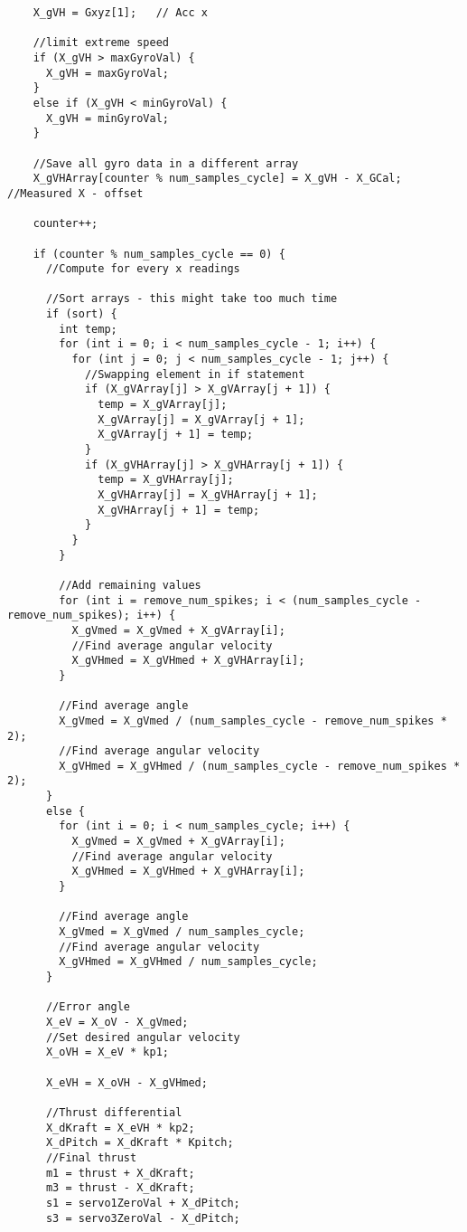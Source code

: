 \begin{lstlisting}
    X_gVH = Gxyz[1];   // Acc x
 
    //limit extreme speed
    if (X_gVH > maxGyroVal) {
      X_gVH = maxGyroVal;
    }
    else if (X_gVH < minGyroVal) {
      X_gVH = minGyroVal;
    }
 
    //Save all gyro data in a different array
    X_gVHArray[counter % num_samples_cycle] = X_gVH - X_GCal; //Measured X - offset
 
    counter++;
 
    if (counter % num_samples_cycle == 0) {
      //Compute for every x readings
 
      //Sort arrays - this might take too much time
      if (sort) {
        int temp;
        for (int i = 0; i < num_samples_cycle - 1; i++) {
          for (int j = 0; j < num_samples_cycle - 1; j++) {
            //Swapping element in if statement
            if (X_gVArray[j] > X_gVArray[j + 1]) {
              temp = X_gVArray[j];
              X_gVArray[j] = X_gVArray[j + 1];
              X_gVArray[j + 1] = temp;
            }
            if (X_gVHArray[j] > X_gVHArray[j + 1]) {
              temp = X_gVHArray[j];
              X_gVHArray[j] = X_gVHArray[j + 1];
              X_gVHArray[j + 1] = temp;
            }
          }
        }
 
        //Add remaining values
        for (int i = remove_num_spikes; i < (num_samples_cycle - remove_num_spikes); i++) {
          X_gVmed = X_gVmed + X_gVArray[i];
          //Find average angular velocity
          X_gVHmed = X_gVHmed + X_gVHArray[i];
        }
 
        //Find average angle
        X_gVmed = X_gVmed / (num_samples_cycle - remove_num_spikes * 2);
        //Find average angular velocity
        X_gVHmed = X_gVHmed / (num_samples_cycle - remove_num_spikes * 2);
      }
      else {
        for (int i = 0; i < num_samples_cycle; i++) {
          X_gVmed = X_gVmed + X_gVArray[i];
          //Find average angular velocity
          X_gVHmed = X_gVHmed + X_gVHArray[i];
        }
 
        //Find average angle
        X_gVmed = X_gVmed / num_samples_cycle;
        //Find average angular velocity
        X_gVHmed = X_gVHmed / num_samples_cycle;
      }
 
      //Error angle
      X_eV = X_oV - X_gVmed;
      //Set desired angular velocity
      X_oVH = X_eV * kp1;
 
      X_eVH = X_oVH - X_gVHmed;
 
      //Thrust differential
      X_dKraft = X_eVH * kp2;
      X_dPitch = X_dKraft * Kpitch;
      //Final thrust
      m1 = thrust + X_dKraft;
      m3 = thrust - X_dKraft;
      s1 = servo1ZeroVal + X_dPitch;
      s3 = servo3ZeroVal - X_dPitch;


\end{lstlisting}
